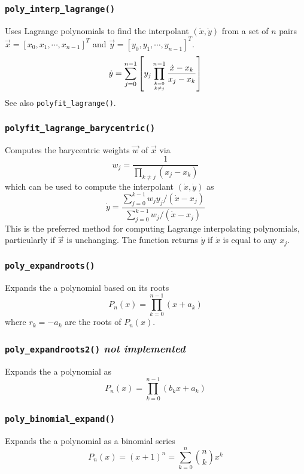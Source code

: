 \subsubsection{{\tt poly\_interp\_lagrange()}}
Uses Lagrange polynomials to find the interpolant
$(\dot{x},\dot{y})$ from a set of $n$ pairs
$\vec{x}=[x_0,x_1,\cdots,x_{n-1}]^T$ and 
$\vec{y}=[y_0,y_1,\cdots,y_{n-1}]^T$.
\[
    \dot{y} =
        \sum_{j=0}^{n-1} {
            \left[
            y_j
            \prod_{{k=0}\atop{k \ne j}}^{n-1} {
                \frac{\dot{x}-x_k}{x_j-x_k}
            }
            \right]
        }
\]
See also {\tt polyfit\_lagrange()}.

\subsubsection{{\tt polyfit\_lagrange\_barycentric()}}
Computes the barycentric weights $\vec{w}$ of $\vec{x}$ via
\[
    w_j =   \frac{1}{
                \prod_{k \ne j}{\left(x_j - x_k\right)}
            }
\]
which can be used to compute the interpolant $(\dot{x},\dot{y})$ as
\[
    \dot{y} =   \frac{
                    \sum\limits_{j=0}^{k-1}{ w_j y_j /(\dot{x}-x_j) }
                } {
                    \sum\limits_{j=0}^{k-1}{     w_j /(\dot{x}-x_j) }
                }
\]
This is the preferred method for computing Lagrange interpolating polynomials,
particularly if $\vec{x}$ is unchanging.
The function returns $\dot{y}$ if $\dot{x}$ is equal to any $x_j$.

\subsubsection{{\tt poly\_expandroots()}}
Expands the a polynomial based on its roots
\[
    P_n(x) = \prod_{k=0}^{n-1}{(x+a_k)}
\]
where $r_k=-a_k$ are the roots of $P_n(x)$.

\subsubsection{{\tt poly\_expandroots2()} {\it not implemented}}
Expands the a polynomial as
\[
    P_n(x) = \prod_{k=0}^{n-1}{(b_kx+a_k)}
\]

\subsubsection{{\tt poly\_binomial\_expand()}}
Expands the a polynomial as a binomial series
\[
    P_n(x) = (x+1)^n = \sum_{k=0}^{n}{ {n \choose k} x^k}
\]

